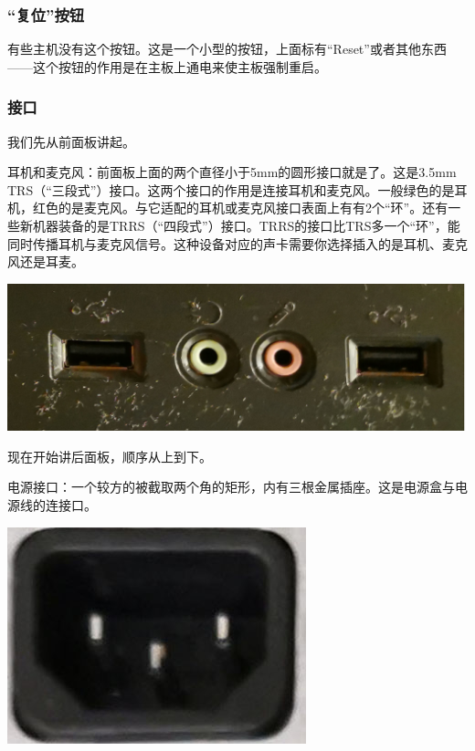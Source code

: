 \subsubsection{“复位”按钮}
有些主机没有这个按钮。这是一个小型的按钮，上面标有“Reset”或者其他东西——这个按钮的作用是在主板上通电来使主板强制重启。{\color{red}{警告！不要尝试使用这种方法关闭计算机——这有可能导致严重的数据丢失！}}
\subsubsection{接口}
我们先从前面板讲起。\par
耳机和麦克风：前面板上面的两个直径小于5mm的圆形接口就是了。这是3.5mm TRS（“三段式”）接口。这两个接口的作用是连接耳机和麦克风。一般绿色的是耳机，红色的是麦克风。与它适配的耳机或麦克风接口表面上有有2个“环”。还有一些新机器装备的是TRRS（“四段式”）接口。TRRS的接口比TRS多一个“环”，能同时传播耳机与麦克风信号。这种设备对应的声卡需要你选择插入的是耳机、麦克风还是耳麦。
\begin{center}
	\includegraphics[scale=0.12]{pic/Box1}
\end{center}\par
现在开始讲后面板，顺序从上到下。\par
电源接口：一个较方的被截取两个角的矩形，内有三根金属插座。这是电源盒与电源线的连接口。
\begin{center}
	\includegraphics[scale=0.6]{pic/Power}
\end{center}\par
